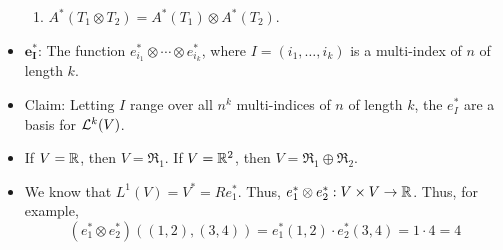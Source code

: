 \documentclass[../notes.tex]{subfiles}
\begin{document}
\begin{itemize}
\begin{enumerate}
        \item $A^*(T_1\otimes T_2)=A^*(T_1)\otimes A^*(T_2)$.
    \end{enumerate}
    \item $\bm{e_I^*}$: The function $e_{i_1}^*\otimes\cdots\otimes e_{i_k}^*$, where $I=(i_1,\dots,i_k)$ is a multi-index of $n$ of length $k$.
    \item Claim: Letting $I$ range over all $n^k$ multi-indices of $n$ of length $k$, the $e_I^*$ are a basis for $\lin[k]{V}$.
    \item If $V=\R$, then $V=\Re_1$. If $V=\R^2$, then $V=\Re_1\oplus\Re_2$.
    \item We know that $L^1(V)=V^*=Re_1^*$. Thus, $e_1^*\otimes e_2^*:V\times V\to\R$. Thus, for example,
    \begin{equation*}
        (e_1^*\otimes e_2^*)((1,2),(3,4)) = e_1^*(1,2)\cdot e_2^*(3,4)
        = 1\cdot 4
        = 4
    \end{equation*}
\end{itemize}
\end{document}
